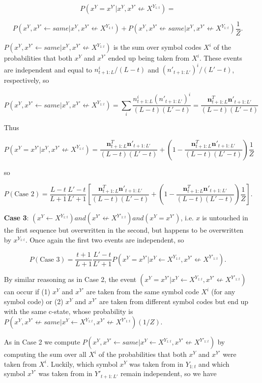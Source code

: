 \documentclass{article}
\begin{document}
$$P(x^Y = x^{Y'}|x^Y, x^{Y'} \not\leftarrow X^{Y_{1:t}}) =$$

$$P(x^Y, x^{Y'} \leftarrow same|x^Y, x^{Y'} \not\leftarrow X^{Y_{1:t}}) + P(x^Y, x^{Y'} \not\leftarrow same|x^Y, x^{Y'} \not\leftarrow X^{Y_{1:t}})\frac{1}{Z}.$$

$P(x^Y, x^{Y'} \leftarrow same|x^Y, x^{Y'} \not\leftarrow X^{Y_{1:t}})$ is the sum over symbol codes $X^i$ of the probabilities that both $x^Y$ and $x^{Y'}$ ended up being taken from $X^i$. These events are independent and equal to $n^i_{t+1:L}/(L-t)$ and $(n'_{t+1:L'})^i/(L'-t)$, respectively, so

$$P(x^Y, x^{Y'} \leftarrow same|x^Y, x^{Y'} \not\leftarrow X^{Y_{1:t}}) = \sum_i \frac{n^i_{t+1:L}(n'_{t+1:L'})^i}{(L-t)(L'-t)} = \frac{\mathbf{n}^T_{t+1:L}\mathbf{n}'_{t+1:L'}}{(L-t)(L'-t)}$$

Thus

$$P(x^Y = x^{Y'}|x^Y, x^{Y'} \not\leftarrow X^{Y_{1:t}}) = \frac{\mathbf{n}^T_{t+1:L}\mathbf{n}'_{t+1:L'}}{(L-t)(L'-t)} + \left(1 - \frac{\mathbf{n}^T_{t+1:L}\mathbf{n}'_{t+1:L'}}{(L-t)(L'-t)} \right)\frac{1}{Z}$$

so

$$P(\textrm{Case 2}) = \frac{L-t}{L+1}\frac{L'-t}{L'+1}\left[\frac{\mathbf{n}^T_{t+1:L}\mathbf{n}'_{t+1:L'}}{(L-t)(L'-t)} + \left(1 - \frac{\mathbf{n}^T_{t+1:L}\mathbf{n}'_{t+1:L'}}{(L-t)(L'-t)} \right)\frac{1}{Z}\right].$$

\textbf{Case 3}: $(x^Y \leftarrow X^{Y_{1:t}}) and (x^{Y'} \not\leftarrow X^{Y'_{1:t}}) and (x^Y = x^{Y'})$, i.e. $x$ is untouched in the first sequence but overwritten in the second, but happens to be overwritten by $x^{Y_{1:t}}$. Once again the first two events are independent, so 

$$P(\textrm{Case 3}) = \frac{t+1}{L+1}\frac{L'-t}{L'+1}P(x^Y = x^{Y'}|x^Y \leftarrow X^{Y_{1:t}}, x^{Y'} \not\leftarrow X^{Y'_{1:t}}).$$

By similar reasoning as in Case 2, the event $(x^Y = x^{Y'}|x^Y \leftarrow X^{Y_{1:t}}, x^{Y'} \not\leftarrow X^{Y'_{1:t}})$ can occur if (1) $x^Y$ and $x^{Y'}$ are taken from the same symbol code $X^i$ (for any symbol code) or (2) $x^Y$ and $x^{Y'}$ are taken from different symbol codes but end up with the same c-state, whose probability is $P(x^Y, x^{Y'} \not\leftarrow same|x^Y \leftarrow X^{Y_{1:t}}, x^{Y'} \not\leftarrow X^{Y'_{1:t}})(1/Z)$.

As in Case 2 we compute $P(x^Y, x^{Y'} \leftarrow same|x^Y \leftarrow X^{Y_{1:t}}, x^{Y'} \not\leftarrow X^{Y'_{1:t}})$ by computing the sum over all $X^i$ of the probabilities that both $x^Y$ and $x^{Y'}$ were taken from $X^i$. Luckily, which symbol $x^Y$ was taken from in $Y_{1:t}$ and which symbol $x^{Y'}$ was taken from in $Y'_{t+1:L'}$ remain independent, so we have
\end{document}
